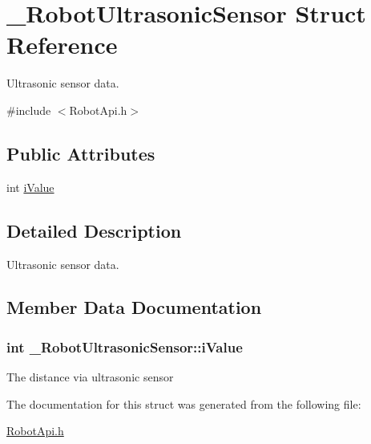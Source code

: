 \hypertarget{struct__RobotUltrasonicSensor}{\section{\+\_\+\+Robot\+Ultrasonic\+Sensor Struct Reference}
\label{struct__RobotUltrasonicSensor}
}


Ultrasonic sensor data.  




{\ttfamily \#include $<$Robot\+Api.\+h$>$}

\subsection*{Public Attributes}
\begin{DoxyCompactItemize}
\item 
int \hyperlink{struct__RobotUltrasonicSensor_a5ca5e4487dcbe1a83820e06ddcd9c047}{i\+Value}
\end{DoxyCompactItemize}


\subsection{Detailed Description}
Ultrasonic sensor data. 

\subsection{Member Data Documentation}
\hypertarget{struct__RobotUltrasonicSensor_a5ca5e4487dcbe1a83820e06ddcd9c047}{
\subsubsection[{i\+Value}]{\setlength{\rightskip}{0pt plus 5cm}int \+\_\+\+Robot\+Ultrasonic\+Sensor\+::i\+Value}}\label{struct__RobotUltrasonicSensor_a5ca5e4487dcbe1a83820e06ddcd9c047}
The distance via ultrasonic sensor 

The documentation for this struct was generated from the following file\+:\begin{DoxyCompactItemize}
\item 
\hyperlink{RobotApi_8h}{Robot\+Api.\+h}\end{DoxyCompactItemize}
